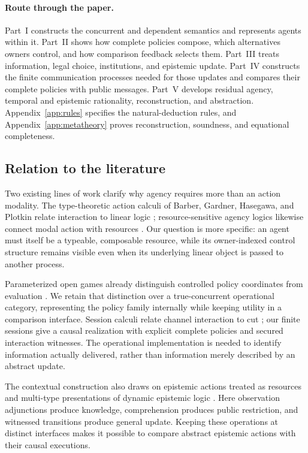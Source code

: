 \documentclass[11pt,a4paper]{article}
\numberwithin{equation}{section}
\theoremstyle{definition}
\theoremstyle{remark}
\theoremstyle{plain}
\begin{document}
\paragraph{Route through the paper.}
Part~I constructs the concurrent and dependent semantics and represents
agents within it. Part~II shows how complete policies compose, which
alternatives owners control, and how comparison feedback selects them.
Part~III treats information, legal choice, institutions, and epistemic
update. Part~IV constructs the finite communication processes needed for
those updates and compares their complete policies with public messages.
Part~V develops residual agency, temporal and epistemic rationality,
reconstruction, and abstraction. Appendix~\ref{app:rules} specifies the natural-deduction
rules, and Appendix~\ref{app:metatheory} proves reconstruction, soundness,
and equational completeness.

\subsection*{Relation to the literature}

Two existing lines of work clarify why agency requires more than an
action modality. The type-theoretic action calculi of Barber, Gardner,
Hasegawa, and Plotkin relate interaction to linear logic
\citep{agt-BarberEtAl}; resource-sensitive agency logics likewise connect
modal action with resources \citep{agt-PorelloTroquard}. Our question is more
specific: an agent must itself be a typeable, composable resource, while
its owner-indexed control structure remains visible even when its
underlying linear object is passed to another process.

Parameterized open games already distinguish controlled policy
coordinates from evaluation \citep{CapucciEtAl2022Agency}. We retain that
distinction over a true-concurrent operational category, representing the
policy family internally while keeping utility in a comparison interface.
Session calculi relate channel interaction to cut
\citep{agt-CairesEtAl}; our finite sessions give a causal realization with
explicit complete policies and secured interaction witnesses. The
operational implementation is needed to identify information actually
delivered, rather than information merely described by an abstract update.

The contextual construction also draws on epistemic actions treated as
resources \citep{agt-BaltagCoeckeSadrzadeh} and multi-type presentations of
dynamic epistemic logic \citep{agt-FrittellaEtAl}. Here observation
adjunctions produce knowledge, comprehension produces public restriction,
and witnessed transitions produce general update. Keeping these operations
at distinct interfaces makes it possible to compare abstract epistemic
actions with their causal executions.
\end{document}
